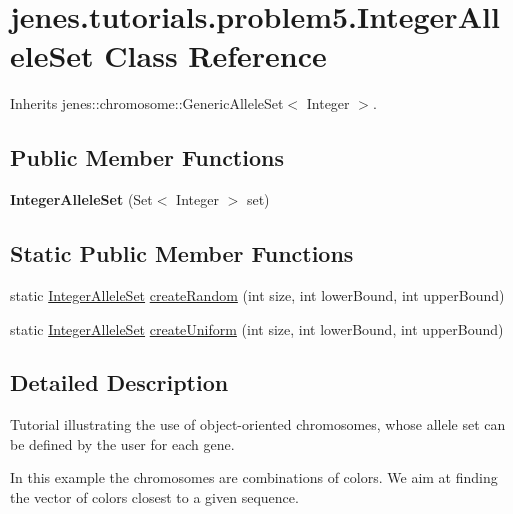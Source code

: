 \hypertarget{classjenes_1_1tutorials_1_1problem5_1_1_integer_allele_set}{
\section{jenes.tutorials.problem5.IntegerAlleleSet Class Reference}
\label{classjenes_1_1tutorials_1_1problem5_1_1_integer_allele_set}
}
Inherits jenes::chromosome::GenericAlleleSet$<$ Integer $>$.

\subsection*{Public Member Functions}
\begin{CompactItemize}
\item 
\hypertarget{classjenes_1_1tutorials_1_1problem5_1_1_integer_allele_set_a8b7a7bdc514aca55686da39f7e430b6}{
\textbf{IntegerAlleleSet} (Set$<$ Integer $>$ set)}
\label{classjenes_1_1tutorials_1_1problem5_1_1_integer_allele_set_a8b7a7bdc514aca55686da39f7e430b6}

\end{CompactItemize}
\subsection*{Static Public Member Functions}
\begin{CompactItemize}
\item 
static \hyperlink{classjenes_1_1tutorials_1_1problem5_1_1_integer_allele_set}{IntegerAlleleSet} \hyperlink{classjenes_1_1tutorials_1_1problem5_1_1_integer_allele_set_f241f0e8dd6564fb5b4c0047eb150bac}{createRandom} (int size, int lowerBound, int upperBound)
\item 
static \hyperlink{classjenes_1_1tutorials_1_1problem5_1_1_integer_allele_set}{IntegerAlleleSet} \hyperlink{classjenes_1_1tutorials_1_1problem5_1_1_integer_allele_set_20d2ef7f0a59edafa82345db48fcefa3}{createUniform} (int size, int lowerBound, int upperBound)
\end{CompactItemize}


\subsection{Detailed Description}
Tutorial illustrating the use of object-oriented chromosomes, whose allele set can be defined by the user for each gene.

In this example the chromosomes are combinations of colors. We aim at finding the vector of colors closest to a given sequence.

